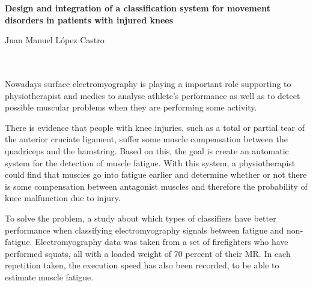 \cleardoublepage


\thispagestyle{empty}


\begin{center}
{\large\bfseries Design and integration of a classification system for movement disorders in patients with injured knees}\\
\end{center}
\begin{center}
Juan Manuel López Castro\\
\end{center}

\\

\vspace{0.7cm}
\\

Nowadays surface electromyography is playing a important role supporting to physiotherapist and medics to analyse athlete's performance as well as to detect possible muscular problems when they are performing some activity.

There is evidence that people with knee injuries, such as a total or partial tear of the anterior cruciate ligament, suffer some muscle compensation between the quadriceps and the hamstring. Based on this, the goal is create an automatic system for the detection of muscle fatigue. With this system, a physiotherapist could find that muscles go into fatigue earlier and determine whether or not there is some compensation between antagonist muscles and therefore the probability of knee malfunction due to injury.

To solve the problem, a study about which types of classifiers have better performance when classifying electromyography signals between fatigue and non-fatigue. Electromyography data was taken from a set of firefighters who have performed squats, all with a loaded weight of 70 percent of their MR. In each repetition taken, the execution speed has also been recorded, to be able to estimate muscle fatigue.





\chapter*{}
\thispagestyle{empty}

